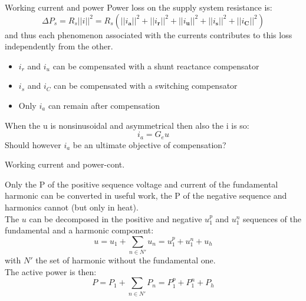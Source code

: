 \documentclass[aspectratio=169]{beamer}
\begin{document}
  \begin{frame}{Working current and power}{\insertsection}
    Power loss on the supply system resistance is: 
    \begin{equation}
    \Delta P_s = R_s||\pmb{\mathit{i}}||^2 = R_s\left(||\pmb{\mathit{i}_a}||^2 + ||\pmb{\mathit{i}_r}||^2 + ||\pmb{\mathit{i}_u}||^2 + ||\pmb{\mathit{i}_s}||^2 + ||\pmb{\mathit{i}_C}||^2\right)
    \end{equation}
    and thus each phenomenon associated with the currents contributes to this loss independently from the other.
    \begin{itemize}
      \item $\pmb{\mathit{i_r}}$ and $\pmb{\mathit{i_u}}$ can be compensated with a shunt reactance compensator
      \item $\pmb{\mathit{i_s}}$ and $\pmb{\mathit{i_C}}$ can be compensated with a switching compensator
      \item Only $\pmb{\mathit{i_a}}$ can remain after compensation
    \end{itemize}
    When the u is nonsinusoidal and asymmetrical then also the i is so: 
    \begin{equation}
      \pmb{\mathit{i}}_a = G_e \pmb{\mathit{u}}
    \end{equation}
    \textcolor{NTNU_orange}{Should however $\pmb{\mathit{i_a}}$ be an ultimate objective of compensation?}
  \end{frame}
  
  \begin{frame}{Working current and power-cont.}{\insertsection}
     
    Only the P of the positive sequence voltage and current of the fundamental harmonic can be converted in useful work, the P of the negative sequence and harmonics cannot (but only in heat). \\
    The  $ \pmb{\mathit{u}}$ can be decomposed in the positive and negative $ \pmb{\mathit{u}}_{1}^{p}$ and $ \pmb{\mathit{u}}_{1}^{n}$ sequences of the fundamental and a harmonic component:
    \begin{equation}
      \pmb{\mathit{u}} =\pmb{\mathit{u}}_{1} + \sum_{n\in N'}\pmb{\mathit{u}}_{n} = \pmb{\mathit{u}}_{1}^{p} + \pmb{\mathit{u}}_{1}^{n} + \pmb{\mathit{u}}_{h}
    \end{equation}
    with $N'$ the set of harmonic without the fundamental one.\\
    The active power is then:
    \begin{equation}
      P =P_{1} + \sum_{n\in N'}P_{n} = P_{1}^{p} + P_{1}^{n} + P_{h}
    \end{equation}

  \end{frame}
\end{document}
